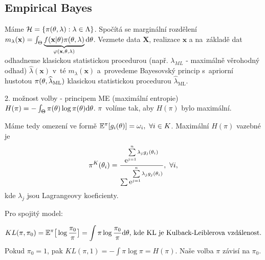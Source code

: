 \subsection{Empirical Bayes}
Máme $\mathcal{H}=\{\pi(\theta,\lambda):\lambda\in\Lambda\}$. Spočítá se marginální rozdělení $m_\lambda(\textbf{x})=\int_\Theta\underbrace{f(\textbf{x}|\theta)\pi(\theta,\lambda)}_{\varphi(\textbf{x},\theta,\lambda)}\mathrm{d}\theta$. Vezmete data $\textbf{X}$, realizace $\textbf{x}$ a  na~základě dat odhadneme klasickou statistickou procedurou (např. $\lambda_{ML}$ - maximálně věrohodný odhad) $\widehat{\lambda}(\textbf{x})$ v~té $m_\lambda(\textbf{x})$ a~provedeme Bayesovský princip s~apriorní hustotou $\pi(\theta,\widehat{\lambda}_{\mathrm{ML}})$ klasickou statistickou procedurou $\widehat{\lambda}_{\mathrm{ML}}$.

2. možnost volby - principem ME (maximální entropie) $H(\pi)=-\int_\Theta\pi(\theta)\log \pi(\theta)\mathrm{d}\theta$. $\pi$~volíme tak, aby $H(\pi)$ bylo maximální.


Máme tedy omezení ve formě $\mathbb{E}^\pi[g_i(\theta)]=\omega_i,~\forall i\in K$. Maximální $H(\pi)$ vazebné je $$\pi^K(\theta_i)=\frac{\mathrm{e}^{\sum\limits_{j=1}^{n} \lambda_j g_j(\theta_i)}}{\sum \mathrm{e}^{\sum\limits_{j=1}^{n} \lambda_jg_j(\theta_i)}},~\forall i,$$
kde $\lambda_j$ jsou Lagrangeovy koeficienty.

Pro spojitý model:

$$ KL(\pi,\pi_0)=\mathbb{E}^\pi\big[\log\frac{\pi_0}{\pi}\big]=\int\pi\log\frac{\pi_0}{\pi}\mathrm{d}\theta \text{, kde KL je Kulback-Leiblerova vzdálenost}.$$
Pokud $\pi_0=1$, pak $KL(\pi,1)=-\int\pi\log\pi=H(\pi)$. Naše volba $\pi$ závisí na $\pi_0$.

